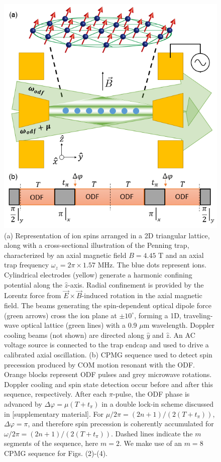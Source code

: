 \documentclass[aps,prl,twocolumn,superscriptaddress,floatfix,nofootinbib]{revtex4-1}
\begin{document}
\begin{figure}
    \centering
    \includegraphics[width=.45\textwidth]{expt_cpmg}
    \caption{(a) Representation of ion spins arranged in a 2D triangular lattice, along with a cross-sectional illustration of the Penning trap, characterized by an axial magnetic field $B = 4.45$ T and an axial trap frequency $\omega_z = 2\pi \times 1.57$ MHz. The blue dots represent ions. Cylindrical electrodes (yellow) generate a harmonic confining potential along the $\hat{z}$-axis. Radial confinement is provided by the Lorentz force from $\vec{E} \times \vec{B}$-induced rotation in the axial magnetic field. The beams generating the spin-dependent optical dipole force (green arrows) cross the ion plane at $\pm 10^{\circ}$, forming a 1D, traveling-wave optical lattice (green lines) with a 0.9 $\mu$m wavelength. Doppler cooling beams (not shown) are directed along $\hat{y}$ and $\hat{z}$. An AC voltage source is connected to the trap endcap and used to drive a calibrated axial oscillation. (b) CPMG sequence used to detect spin precession produced by COM motion resonant with the ODF. Orange blocks represent ODF pulses and grey microwave rotations. Doppler cooling and spin state detection occur before and after this sequence, respectively. After each $\pi$-pulse, the ODF phase is advanced by $\Delta\varphi = \mu(T+t_{\pi})$ in a double lock-in scheme discussed in [supplementary material]. For $\mu/2\pi = (2n+1)/(2(T+t_{\pi}))$, $\Delta\varphi = \pi$, and therefore spin precession is coherently accumulated for $\omega/2\pi = (2n+1)/(2(T+t_{\pi}))$. Dashed lines indicate the $m$ segments of the sequence, here $m = 2$. We make use of an $m = 8$ CPMG sequence for Figs. (2)-(4).} 
    \label{Expt}
\end{figure}
\end{document}
